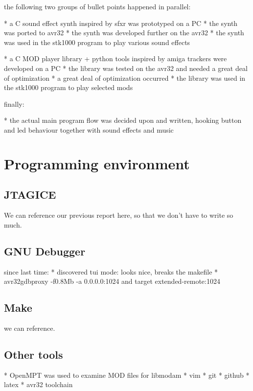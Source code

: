 the following two groups of bullet points happened in parallel:

* a C sound effect synth inspired by sfxr was prototyped on a PC
* the synth was ported to avr32
* the synth was developed further on the avr32
* the synth was used in the stk1000 program to play various sound effects

* a C MOD player library + python tools inspired by amiga trackers were developed on a PC
* the library was tested on the avr32 and needed a great deal of optimization
* a great deal of optimization occurred 
* the library was used in the stk1000 program to play selected mods


finally:

* the actual main program flow was decided upon and written, hooking button and led behaviour together with sound effects and music





\section{Programming environment}

\subsection{JTAGICE}
We can reference our previous report here, so that we don't have to write so much.

\subsection{GNU Debugger}
since last time:
* discovered tui mode: looks nice, breaks the makefile
* avr32gdbproxy -f0.8Mb -a 0.0.0.0:1024 and target extended-remote:1024

\subsection{Make}
we can reference.

\subsection{Other tools}
* OpenMPT was used to examine MOD files for libmodam
* vim
* git
* github
* latex
* avr32 toolchain



